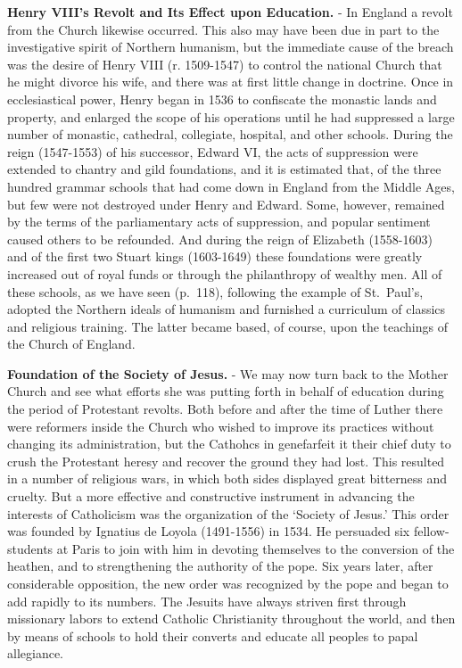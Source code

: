 \documentclass[]{book}
\begin{document}
\textbf{Henry VIII's Revolt and Its Effect upon Education.} - In England a revolt from the Church likewise occurred. This also may have been due in part to the investigative spirit of Northern humanism, but the immediate cause of the breach was the desire of Henry VIII (r. 1509-1547) to control the national Church that he might divorce his wife, and there was at first little change in doctrine. Once in ecclesiastical power, Henry began in 1536 to confiscate the monastic lands and property, and enlarged the scope of his operations until he had suppressed a large number of monastic, cathedral, collegiate, hospital, and other schools. During the reign (1547-1553) of his successor, Edward VI, the acts of suppression were extended to chantry and gild foundations, and it is estimated that, of the three hundred grammar schools that had come down in England from the Middle Ages, but few were not destroyed under Henry and Edward. Some, however, remained by the terms of the parliamentary acts of suppression, and popular sentiment caused others to be refounded. And during the reign of Elizabeth (1558-1603) and of the first two Stuart kings (1603-1649) these foundations were greatly increased out of royal funds or through the philanthropy of wealthy men. All of these schools, as we have seen (p.~118), following the example of St.~Paul's, adopted the Northern ideals of humanism and furnished a curriculum of classics and religious training. The latter became based, of course, upon the teachings of the Church of England.

\textbf{Foundation of the Society of Jesus.} - We may now turn back to the Mother Church and see what efforts she was putting forth in behalf of education during the period of Protestant revolts. Both before and after the time of Luther there were reformers inside the Church who wished to improve its practices without changing its administration, but the Cathohcs in genefarfeit it their chief duty to crush the Protestant heresy and recover the ground they had lost. This resulted in a number of religious wars, in which both sides displayed great bitterness and cruelty. But a more effective and constructive instrument in advancing the interests of Catholicism was the organization of the `Society of Jesus.' This order was founded by Ignatius de Loyola (1491-1556) in 1534. He persuaded six fellow-students at Paris to join with him in devoting themselves to the conversion of the heathen, and to strengthening the authority of the pope. Six years later, after considerable opposition, the new order was recognized by the pope and began to add rapidly to its numbers. The Jesuits have always striven first through missionary labors to extend Catholic Christianity throughout the world, and then by means of schools to hold their converts and educate all peoples to papal allegiance.
\end{document}
